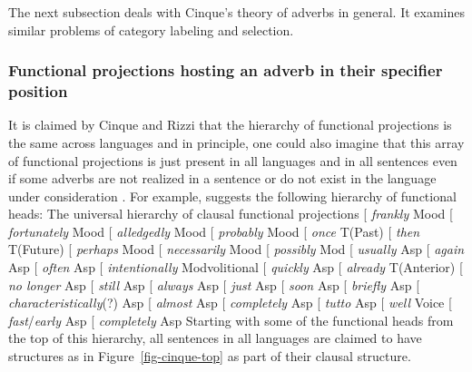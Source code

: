 The next subsection deals with Cinque's theory of adverbs in general. It examines similar problems
of category labeling and selection.



\subsubsection{Functional projections hosting an adverb in their specifier position}
\label{sec-funct-proj-and-adverbs}
\label{sec-major-minor-category}

It is claimed by Cinque and Rizzi that the hierarchy of functional projections is the same across
languages and in principle, one could also imagine that this array of functional projections is just
present in all languages and in all sentences even if some adverbs are not realized in a sentence or
do not exist in the language under consideration \citep[]{CR2010a}. For example, \citet[]{Cinque99a-u} suggests the following hierarchy of functional heads:
\ea
\label{ex-adjunct-hierarchy}
The universal hierarchy of clausal functional projections \citep[]{Cinque99a-u}
{}[ \emph{frankly} Mood [ \emph{fortunately} Mood [ \emph{alledgedly}
Mood [ \emph{probably} Mood [ \emph{once} T(Past) [ \emph{then}
T(Future) [ \emph{perhaps}
Mood [ \emph{necessarily} Mood [ \emph{possibly} Mod [ \emph{usually}
Asp [ \emph{again} Asp [ \emph{often} Asp [ \emph{intentionally}
Mod{volitional} [ \emph{quickly} Asp [ \emph{already} T(Anterior) [ \emph{no longer}
Asp [ \emph{still} Asp [ \emph{always} Asp [ \emph{just}
Asp [ \emph{soon} Asp [ \emph{briefly} Asp [
\emph{characteristically}(?) Asp [ \emph{almost} Asp [ \emph{completely}
Asp [ \emph{tutto} Asp [ \emph{well} Voice [ \emph{fast}/\emph{early}
Asp [ \emph{completely} Asp
\z 
Starting with some of the functional heads from the top of this hierarchy, all sentences in all
languages are claimed to have structures as in Figure~\ref{fig-cinque-top} as part of their clausal structure.
